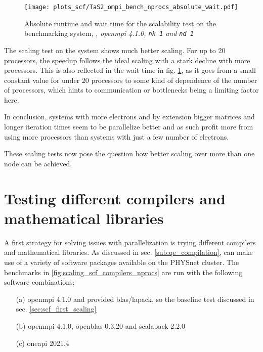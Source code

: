 \documentclass[main.tex]{subfiles}
\begin{document}
\begin{figure}[ht!]
\centering
\texttt{[image: plots\_scf/TaS2\_ompi\_bench\_nprocs\_absolute\_wait.pdf]}
\caption{Absolute runtime and wait time for the scalability test on the \TaS benchmarking system, \emph{, \gls{openmpi} 4.1.0, \texttt{nk 1} and \texttt{nd 1}}}
\label{fig:scaling_scf_ompi_nprocs_tas2_absolute_wait}
\end{figure}
The scaling test on the \TaS system shows much better scaling.
For up to 20 processors, the speedup follows the ideal scaling with a stark decline with more processors.
This is also reflected in the wait time in fig. \ref{fig:scaling_scf_ompi_nprocs_tas2_absolute_wait}, as it goes from a small constant value for under 20 processors to some kind of dependence of the number of processors, which hints to communication or bottlenecks being a limiting factor here.

In conclusion, systems with more electrons and by extension bigger matrices and longer iteration times seem to be parallelize better and as such profit more from using more processors than systems with just a few number of electrons.

These scaling tests now pose the question how better scaling over more than one node can be achieved.

\section{Testing different compilers and mathematical libraries}\label{sec:scf_scaling_compilers}

A first strategy for solving issues with parallelization is trying different compilers and mathematical libraries.
As discussed in sec. \ref{sub:qe_compilation}, \QE can make use of a variety of software packages available on the PHYSnet cluster.
The benchmarks in \ref{fig:scaling_scf_compilers_nprocs} are run with the following software combinations:
\begin{itemize}
    \item[(a)] \gls{openmpi} 4.1.0 and \QE provided \gls{blas}/\gls{lapack}, so the baseline test discussed in sec. \ref{sec:scf_first_scaling}
    \item[(b)] \gls{openmpi} 4.1.0, \gls{openblas} 0.3.20 and \gls{scalapack} 2.2.0
    \item[(c)] \gls{oneapi} 2021.4
\end{itemize}
\end{document}
